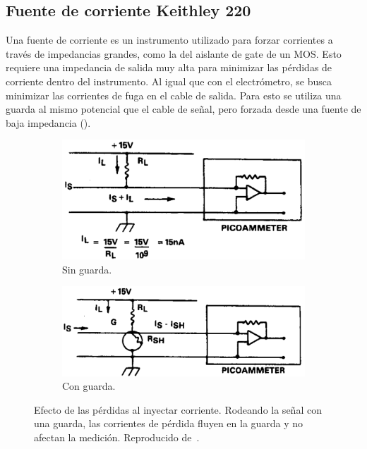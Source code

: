 \subsection{Fuente de corriente Keithley 220}
Una fuente de corriente es un instrumento utilizado para forzar corrientes a
través de impedancias grandes,
como la del aislante de gate de un MOS.
Esto requiere una impedancia de salida muy alta para minimizar las pérdidas de
corriente dentro del instrumento.
Al igual que con el electrómetro,
se busca minimizar las corrientes de fuga en el cable de salida.
Para esto se utiliza una guarda al mismo potencial que el cable de señal,
pero forzada desde una fuente de baja impedancia ().
\begin{figure}[H]
    \begin{subfigure}[b]{\textwidth}
    \centering
        \includegraphics{figuras/instrumental/220unguarded.png}
        \caption{Sin guarda.}
    \end{subfigure}
    \begin{subfigure}[b]{\textwidth}
    \centering
        \includegraphics{figuras/instrumental/220guarded.png}
        \caption{Con guarda.}
    \end{subfigure}
        \caption{Efecto de las pérdidas al inyectar corriente.
        Rodeando la señal con una guarda, las corrientes de pérdida fluyen en
        la guarda y no afectan la medición.
    Reproducido de~\cite{keithley_instruments_inc._keithley_1984}.}
    \label{fig:220guard}
\end{figure}
